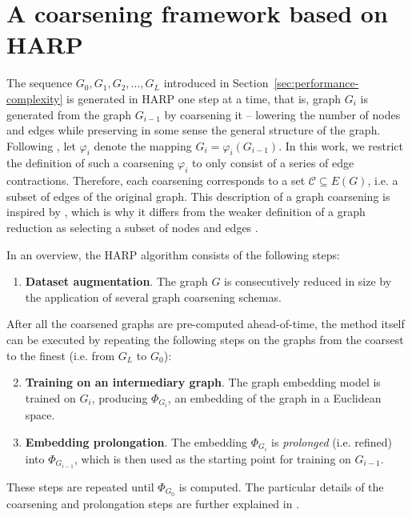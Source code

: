 \section{A coarsening framework based on HARP}\label{sec:harp}

The sequence \( G_0, G_1, G_2, \dots, G_L \) introduced in Section~\ref{sec:performance-complexity} is generated in HARP one step at a time, that is, graph \( G_i \) is generated from the graph \( G_{i - 1} \) by coarsening it -- lowering the number of nodes and edges while preserving in some sense the general structure of the graph. Following \cite{chen_harp_2018}, let \( \varphi_i \) denote the mapping \( G_i = \varphi_i \left( G_{i - 1} \right) \). In this work, we restrict the definition of such a coarsening \( \varphi_i \) to only consist of a series of edge contractions. Therefore, each coarsening corresponds to a set \( \mathcal{C} \subseteq E \left( G \right) \), i.e. a subset of edges of the original graph. This description of a graph coarsening is inspired by \cite{schulz_mining_2019}, which is why it differs from the weaker definition of a graph reduction as selecting a subset of nodes and edges \cite{huang_scaling_2021,loukas_graph_2019}.

In an overview, the HARP algorithm consists of the following steps:

\begin{enumerate}
  \item \textbf{Dataset augmentation}. The graph \( G \) is consecutively reduced in size by the application of several graph coarsening schemas.
\end{enumerate}
After all the coarsened graphs are pre-computed ahead-of-time, the method itself can be executed by repeating the following steps on the graphs from the coarsest to the finest (i.e. from \( G_L \) to \( G_0 \)):
\begin{enumerate}\setcounter{enumi}{1}
  \item \textbf{Training on an intermediary graph}. The graph embedding model is trained on \( G_i \), producing \( \Phi_{G_i} \), an embedding of the graph in a Euclidean space.
  \item \textbf{Embedding prolongation}. The embedding \( \Phi_{G_i} \) is \textit{prolonged} (i.e. refined) into \( \Phi_{G_{i - 1}} \), which is then used as the starting point for training on \( G_{i - 1} \).
\end{enumerate}
These steps are repeated until \( \Phi_{G_0} \) is computed. The particular details of the coarsening and prolongation steps are further explained in \cite{chen_harp_2018}.
